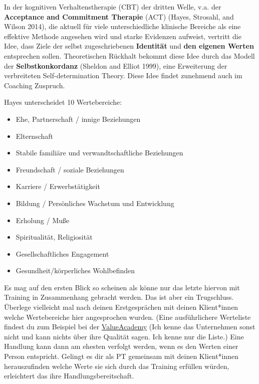 \documentclass[
  letterpaper,
  DIV=11,
  numbers=noendperiod]{scrreprt}
\providecommand{\tightlist}{%
  \setlength{\itemsep}{0pt}\setlength{\parskip}{0pt}}
\begin{document}
In der kognitiven Verhaltenstherapie (CBT) der dritten Welle, v.a. der
\textbf{Acceptance and Commitment Therapie} (ACT) (Hayes, Strosahl, and
Wilson 2014), die aktuell für viele unterschiedliche klinische Bereiche
als eine effektive Methode angesehen wird und starke Evidenzen aufweist,
vertritt die Idee, dass Ziele der selbst zugeschriebenen
\textbf{Identität} und \textbf{den eigenen Werten} entsprechen sollen.
Theoretischen Rückhalt bekommt diese Idee durch das Modell der
\textbf{Selbstkonkordanz} (Sheldon and Elliot 1999), eine Erweiterung
der verbreiteten Self-determination Theory. Diese Idee findet zunehmend
auch im Coaching Zuspruch.

Hayes unterscheidet 10 Wertebereiche:

\begin{itemize}
\tightlist
\item
  Ehe, Partnerschaft / innige Beziehungen
\item
  Elternschaft
\item
  Stabile familiäre und verwandtschaftliche Beziehungen
\item
  Freundschaft / soziale Beziehungen
\item
  Karriere / Erwerbstätigkeit
\item
  Bildung / Persönliches Wachstum und Entwicklung
\item
  Erholung / Muße
\item
  Spiritualität, Religiosität
\item
  Gesellschaftliches Engagement
\item
  Gesundheit/körperliches Wohlbefinden
\end{itemize}

Es mag auf den ersten Blick so scheinen als könne nur das letzte hiervon
mit Training in Zusammenhang gebracht werden. Das ist aber ein
Trugschluss. Überlege vielleicht mal nach deinen Erstgesprächen mit
deinen Klient*innen welche Wertebereiche hier angesprochen wurden. (Eine
ausführlichere Werteliste findest du zum Beispiel bei der
\href{https://www.values-academy.de/wp-content/uploads/2022/01/WERTE-LISTE_Download_220105.pdf}{ValueAcademy}
(Ich kenne das Unternehmen sonst nicht und kann nichts über ihre
Qualität sagen. Ich kenne nur die Liste.) Eine Handlung kann dann am
ehesten verfolgt werden, wenn es den Werten einer Person entspricht.
Gelingt es dir als PT gemeinsam mit deinen Klient*innen herauszufinden
welche Werte sie sich durch das Training erfüllen würden, erleichtert
das ihre Handlungsbereitschaft.
\end{document}
